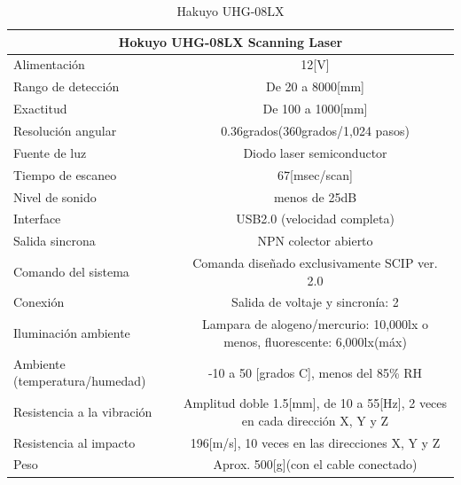 \documentclass[user_manual.tex]{subfiles}
\begin{document}
\begin{table}[H]
\begin{tabular}{|l|l|}%


\hline
\multicolumn{2}{|c|}{Hokuyo UHG-08LX Scanning Laser} \\ \hline %
Alimentación &  \multicolumn{1}{|c|}{12[V]}\\ \hline
Rango de detección & \multicolumn{1}{|c|}{De 20 a 8000[mm]}\\ \hline
Exactitud & \multicolumn{1}{|c|}{De 100 a 1000[mm]}\\ \hline
Resolución angular & \multicolumn{1}{|c|}{0.36grados(360grados/1,024 pasos)}\\ \hline

Fuente de luz & \multicolumn{1}{|c|}{Diodo laser semiconductor }\\ \hline
Tiempo de escaneo & \multicolumn{1}{|c|}{67[msec/scan]}\\ \hline
Nivel de sonido & \multicolumn{1}{|c|}{menos de 25dB}\\ \hline
Interface & \multicolumn{1}{|c|}{USB2.0 (velocidad completa)}\\ \hline
Salida sincrona & \multicolumn{1}{|c|}{NPN colector abierto}\\ \hline
Comando del sistema & \multicolumn{1}{|c|}{Comanda diseñado exclusivamente SCIP ver. 2.0}\\ \hline
Conexión & \multicolumn{1}{|c|}{Salida de voltaje y sincronía: 2}\\ \hline
Iluminación ambiente & \multicolumn{1}{|c|}{Lampara de alogeno/mercurio: 10,000lx o menos, fluorescente: 6,000lx(máx)}\\ \hline
Ambiente (temperatura/humedad) & \multicolumn{1}{|c|}{-10 a 50 [grados C], menos del 85\% RH}\\ \hline
Resistencia a la vibración & \multicolumn{1}{|c|}{Amplitud doble 1.5[mm], de 10 a 55[Hz], 2 veces en cada dirección X, Y y Z}\\ \hline
Resistencia al impacto & \multicolumn{1}{|c|}{196[m/s], 10 veces en las direcciones X, Y y Z}\\ \hline
Peso & \multicolumn{1}{|c|}{Aprox. 500[g](con el cable conectado)}\\ \hline

\end{tabular}
\caption{Hakuyo UHG-08LX}
\label{Datos del Hokuyo}
\end{table}
\end{document}
